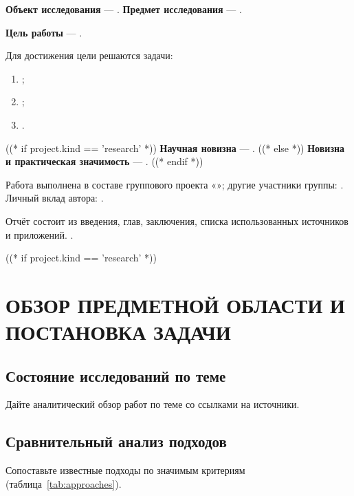 \documentclass[12pt,a4paper]{extreport}
\begin{document}
\textbf{Объект исследования} --- .
\textbf{Предмет исследования} --- .

\textbf{Цель работы} --- .

Для достижения цели решаются задачи:
\begin{enumerate}[label=\arabic*), leftmargin=1.25cm]
  \item {};
  \item {};
  \item {}.
\end{enumerate}

((* if project.kind == 'research' *))
\textbf{Научная новизна} --- .
((* else *))
\textbf{Новизна и практическая значимость} --- .
((* endif *))

\ifhseTeam
Работа выполнена в составе группового проекта «\hseSystemName»; другие участники группы: \hseTeamMembers. Личный вклад автора: .
\fi

Отчёт состоит из введения,  глав, заключения, списка использованных источников и приложений. .

((* if project.kind == 'research' *))
\clearpage
\chapter{ОБЗОР ПРЕДМЕТНОЙ ОБЛАСТИ И ПОСТАНОВКА ЗАДАЧИ}
\section{Состояние исследований по теме}
Дайте аналитический обзор работ по теме со ссылками на источники.

\section{Сравнительный анализ подходов}
Сопоставьте известные подходы по значимым критериям (таблица~\ref{tab:approaches}).
\end{document}
